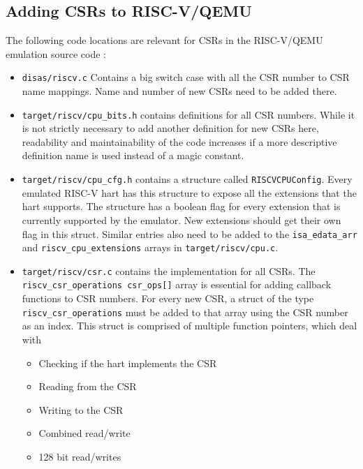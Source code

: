 

\subsection{Adding CSRs to RISC-V/QEMU}

The following code locations are relevant for CSRs in the RISC-V/QEMU emulation source code \cite{QEMUSource2024}:
\begin{itemize}
    \item \texttt{disas/riscv.c} Contains a big switch case with all the CSR number to CSR name mappings.
          Name and number of new CSRs need to be added there.
    \item \texttt{target/riscv/cpu\_bits.h} contains definitions for all CSR numbers.
          While it is not strictly necessary to add another definition for new CSRs here, readability and maintainability
          of the code increases if a more descriptive definition name is used instead of a magic constant.
    \item \texttt{target/riscv/cpu\_cfg.h} contains a structure called \texttt{RISCVCPUConfig}. Every emulated RISC-V hart
          has this structure to expose all the extensions that the hart supports. 
          The structure has a boolean flag for every extension that is currently supported by the emulator.
          New extensions should get their own flag in this struct.
          Similar entries also need to be added to the \texttt{isa\_edata\_arr} and \texttt{riscv\_cpu\_extensions} arrays in \texttt{target/riscv/cpu.c}.
    \item \texttt{target/riscv/csr.c} contains the implementation for all CSRs. The \texttt{riscv\_csr\_operations csr\_ops[]}
          array is essential for adding callback functions to CSR numbers.
          For every new CSR, a struct of the type \texttt{riscv\_csr\_operations} must be added to that array using the
          CSR number as an index. This struct is comprised of multiple function pointers, which deal with
          \begin{itemize}
              \item Checking if the hart implements the CSR
              \item Reading from the CSR
              \item Writing to the CSR
              \item Combined read/write
              \item 128 bit read/writes
          \end{itemize}
\end{itemize}

